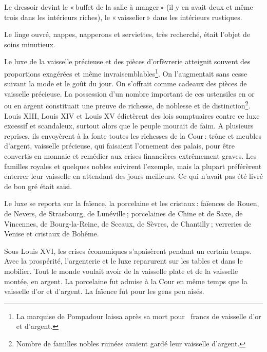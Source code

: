 Le dressoir devint le « buffet de la salle à manger » (il y en avait deux et
même trois dans les intérieurs riches), le « vaisselier » dans les intérieurs
rustiques.

Le linge ouvré, nappes, napperons et serviettes, très recherché, était l'objet
de soins minutieux.

Le luxe de la vaisselle précieuse et des pièces d'orfèvrerie atteignit souvent
des proportions exagérées et même invraisemblables\footnote{La marquise de
Pompadour laissa après sa mort pour {\mmm} {\mmm} francs de
vaisselle d'or et d'argent.}. On l’augmentait sans cesse suivant la mode et le
goût du jour. On s'offrait comme cadeaux des pièces de vaisselle précieuse. La
possession d'un nombre important de ces ustensiles en or ou en argent
constituait une preuve de richesse, de noblesse et de
distinction\footnote{Nombre de familles nobles ruinées avaient gardé leur
vaisselle d'argent.}. Louis XIII, Louis XIV et Louis XV édictèrent des lois
somptuaires contre ce luxe excessif et scandaleux, surtout alors que le peuple
mourait de faim. A plusieurs reprises, ils envoyèrent à la fonte toutes les
richesses de la Cour : trône et meubles d'argent, vaisselle précieuse, qui
faisaient l'ornement des palais, pour être convertis en monnaie et remédier aux
crises financières extrêmement graves. Les familles royales et quelques nobles
suivirent l'exemple, mais la plupart préférèrent enterrer leur vaisselle en
attendant des jours meilleurs. Ce qui n'avait pas été livré de bon gré était
saisi.

Le luxe se reporta sur la faïence, la porcelaine et les cristaux : faïences de
Rouen, de Nevers, de Strasbourg, de Lunéville ; porcelaines de Chine et de Saxe,
de Vincennes, de Bourg-la-Reine, de Sceaux, de Sèvres, de Chantilly ; verreries
de Venise et cristaux de Bohême.

Sous Louis XVI, les crises économiques s'apaisèrent pendant un certain temps.
Avec la prospérité, l'argenterie et le luxe reparurent sur les tables et dans
le mobilier. Tout le monde voulait avoir de la vaisselle plate et de la
vaisselle montée, en argent. La porcelaine fut admise à la Cour en même temps
que la vaisselle d'or et d'argent. La faïence fut pour les gens peu aisés.

